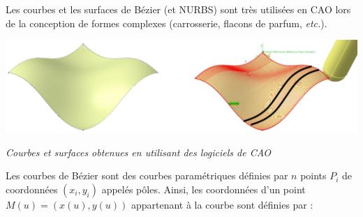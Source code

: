 \documentclass[10pt]{article}
\newif\ifxp
\begin{document}
\ifxp

\else

\fi


Les courbes et les surfaces de Bézier (et NURBS) sont très utilisées en CAO lors de la conception de formes complexes (carrosserie, flacons de parfum, \textit{etc.}).

\begin{center}
\includegraphics[width=.8\textwidth]{images/surf.png}
 
\textit{Courbes et surfaces obtenues en utilisant des logiciels de CAO }
\end{center}


Les courbes de Bézier sont des courbes paramétriques définies par $n$ points $P_i$ de coordonnées $\left(x_i,y_i\right)$ appelés pôles. Ainsi, les coordonnées d'un point $M(u)=\left(x(u),y(u)\right)$ appartenant à la courbe sont définies par : 
\end{document}
